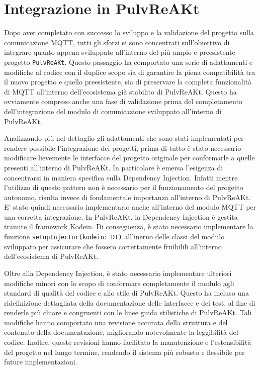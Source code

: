 \documentclass[12pt,a4paper,openright,twoside]{book}
\begin{document}
\pagebreak

\section{Integrazione in PulvReAKt}

Dopo aver completato con successo lo sviluppo e la validazione del progetto sulla comunicazione \ac{MQTT}, tutti gli sforzi si sono concentrati sull'obiettivo di 
integrare quanto appena sviluppato all'interno del più ampio e preesistente progetto \texttt{PulvReAKt}. Questo passaggio ha comportato una serie di adattamenti e 
modifiche al codice con il duplice scopo sia di garantire la piena compatibilità tra il nuovo progetto e quello preesistente, sia di preservare la completa 
funzionalità di \ac{MQTT} all'interno dell'ecosistema già stabilito di PulvReAKt. Questo ha ovviamente compreso anche una fase di validazione prima del completamento 
dell'integrazione del modulo di comunicazione sviluppato all'interno di PulvReAKt.

Analizzando più nel dettaglio gli adattamenti che sono stati implementati per rendere possibile l'integrazione dei progetti, 
prima di tutto è stato necessario modificare lievemente le interfacce del progetto originale per conformarle a quelle presenti all'interno di PulvReAKt. 
In particolare è emersa l'esigenza di concentrarsi in maniera specifica sulla Dependency Injection. Infatti mentre l'utilizzo di questo pattern non è necessario 
per il funzionamento del progetto autonomo, risulta invece di fondamentale importanza all'interno di PulvReAKt. E' stato quindi necessario implementarlo anche all'interno 
del modulo MQTT per una corretta integrazione. In PulvReAKt, la Dependency Injection è gestita tramite il framework Kodein.
Di conseguenza, è stato necessario implementare la funzione \texttt{setupInjector(kodein: DI)} all'inerno delle classi del modulo sviluppato
per assicurare che fossero correttamente fruibilili all'interno dell'ecosistema di PulvReAKt.

Oltre alla Dependency Injection, è stato necessario implementare ulteriori modifiche minori con lo scopo di conformare completamente il modulo agli standard 
di qualità del codice e allo stile di PulvReAKt. Questo ha incluso una ridefinizione dettagliata della documentazione delle interfacce e dei test, 
al fine di renderle più chiare e congruenti con le linee guida stilistiche di PulvReAKt. Tali modifiche hanno comportato una revisione accurata della struttura 
e del contenuto della documentazione, migliorando notevolmente la leggibilità del codice. Inoltre, queste revisioni hanno facilitato la manutenzione e l'estensibilità 
del progetto nel lungo termine, rendendo il sistema più robusto e flessibile per future implementazioni.
\end{document}
